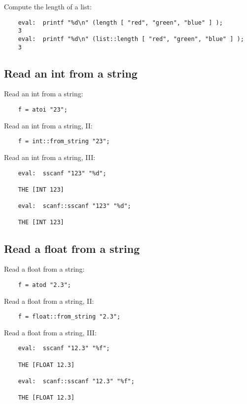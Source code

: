 Compute the length of a list:
\begin{verbatim}
    eval:  printf "%d\n" (length [ "red", "green", "blue" ] );
    3
    eval:  printf "%d\n" (list::length [ "red", "green", "blue" ] );
    3
\end{verbatim}

\cutend*

\subsection{Read an int from a string}

Read an int from a string:
\begin{verbatim}
    f = atoi "23";
\end{verbatim}

Read an int from a string, II:
\begin{verbatim}
    f = int::from_string "23";
\end{verbatim}

Read an int from a string, III:
\begin{verbatim}
    eval:  sscanf "123" "%d";

    THE [INT 123]

    eval:  scanf::sscanf "123" "%d";

    THE [INT 123]
\end{verbatim}

\cutend*

\subsection{Read a float from a string}

Read a float from a string:
\begin{verbatim}
    f = atod "2.3";
\end{verbatim}

Read a float from a string, II:
\begin{verbatim}
    f = float::from_string "2.3";
\end{verbatim}

Read a float from a string, III:
\begin{verbatim}
    eval:  sscanf "12.3" "%f";

    THE [FLOAT 12.3]

    eval:  scanf::sscanf "12.3" "%f";

    THE [FLOAT 12.3]
\end{verbatim}


